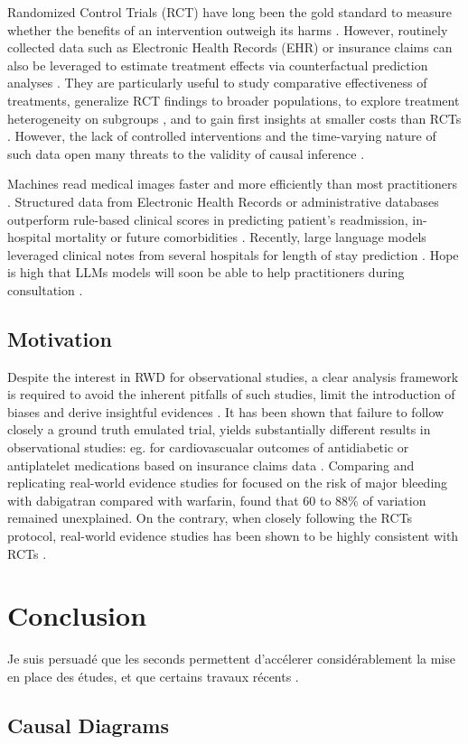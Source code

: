\documentclass{report}
\begin{document}
Randomized Control Trials (RCT) have
long been the gold standard to measure whether the benefits of an intervention
outweigh its harms \citep{brook1986method}. However, routinely collected data
such as Electronic Health Records (EHR) or insurance claims
\citep{wang2023early} can also be leveraged to estimate treatment effects via
counterfactual prediction analyses \citep{hernan2019second}.  They are
particularly useful to study comparative effectiveness of treatments,
generalize RCT findings to broader populations, to explore treatment
heterogeneity on subgroups \citep{mant1999can,desai2021broadening}, and to
gain first insights at smaller costs than RCTs
\citep{black1996we,bosdriesz2020evidence}. However, the lack of controlled
interventions and the time-varying nature of such data open many threats to
the validity of causal inference \citep{bouvier2023should}.


Machines read medical images faster
and more efficiently than most practitioners \citep{zhou2021review}.
Structured data from Electronic Health Records \citep{rajkomar2018scalable} or
administrative databases \citep{beaulieu2021machine} outperform rule-based
clinical scores in predicting patient's readmission, in-hospital mortality or
future comorbidities \citep{li2020behrt}. Recently, large language models
leveraged clinical notes from several hospitals for length of stay prediction
\citep{jiang2023health}. Hope is high that LLMs models will soon be able to
help practitioners during consultation \citep{lee2023benefits}.

\section{Motivation}

Despite the interest in RWD for observational studies, a clear analysis
framework is required to avoid the inherent pitfalls of such studies, limit the
introduction of biases and derive insightful evidences \citep{hernan2019second,
  wang2023emulation}. It has been shown that failure to follow closely a ground
truth emulated trial,
yields substantially different results in observational studies: eg. for
cardiovascualar outcomes of antidiabetic or antiplatelet medications based on
insurance claims data \citep{schneeweiss2021conducting}. Comparing and
replicating real-world evidence studies for focused on the risk of major
bleeding
with dabigatran compared with warfarin, \cite{wang2022understanding} found that
60 to 88\% of variation remained unexplained. On the contrary, when closely
following the RCTs protocol, real-world evidence studies has been shown to be
highly consistent with RCTs \citep{wang2023emulation}.
\clearpage

\chapter{Conclusion}

Je suis persuadé que les seconds permettent d'accélerer considérablement la mise
en place des études, et que certains travaux récents .

\printbibliography

\appendix

\clearpage

\section{Causal Diagrams}
\end{document}

